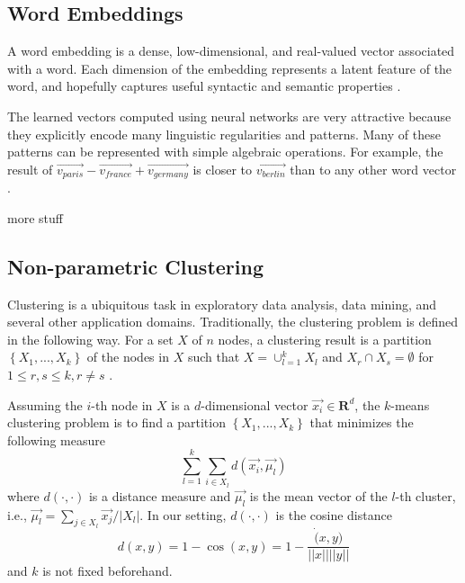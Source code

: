 \documentclass{article}
\begin{document}
\subsection{Word Embeddings}

A word embedding is a dense, low-dimensional, and real-valued vector associated with a word. Each dimension of the embedding represents a latent feature of the word, and hopefully captures useful syntactic and semantic properties \cite{Turian10wordrepresentations}.

The learned vectors computed using neural networks are very attractive because they explicitly encode many linguistic regularities and patterns. Many of these patterns can be represented with simple algebraic operations. For example, the result of $\vec{v_{paris}} - \vec{v_{france}} + \vec{v_{germany}}$ is closer to $\vec{v_{berlin}}$ than to any other word vector \cite{mikolovChen,mikolovYih}.

more stuff

\subsection{Non-parametric Clustering}

Clustering is a ubiquitous task in exploratory data analysis, data mining, and several other application domains. %
Traditionally, the clustering problem is defined in the following way. For a set $X$ of $n$ nodes, a clustering result is a partition $\left\{ {X_1, ..., X_k}\right\}$ of the nodes in $X$ such that $X=\cup_{l=1}^{k}{X_l}$ and $X_r \cap X_s = \emptyset$ for $1 \leq r,s \leq k, r \ne s$ \cite{ChiSZHT07}.

Assuming the $i$-th node in $X$ is a $d$-dimensional vector $\vec{x_i} \in \mathbf{R}^d$, the $k$-means clustering problem is to find a partition $\left\{ {X_1, ..., X_k}\right\}$ that minimizes the following measure
\begin{equation}
\sum_{l=1}^{k} \sum_{i \in X_l} d(\vec{x_i},\vec{\mu_l})
\end{equation}
where $d(\cdot,\cdot)$ is a distance measure and $\vec{\mu_l}$ is the mean vector of the $l$-th cluster, i.e., $\vec{\mu_l} = \sum_{j \in X_l}{\vec{x_j}/|X_l|}$.
In our setting, $d(\cdot,\cdot)$ is the cosine distance
\begin{equation}
d(x,y) = 1 - \cos(x,y) = 1 - \frac{\dot(x,y)}{||x||||y||}
\end{equation}
and $k$ is not fixed beforehand.
\end{document}

